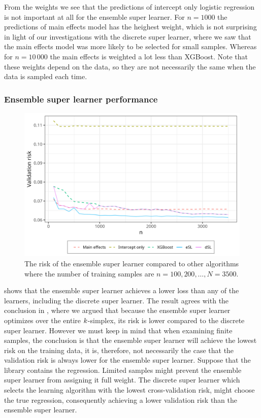 \documentclass[./main.tex]{subfiles}
\begin{document}
From the weights we see that the predictions of intercept only logistic regression is not important at all for the ensemble super learner. For $ n = 1000 $ the predictions of main effects model has the heighest weight, which is not surprising in light of our investigations with the discrete super learner, where we saw that the main effects model was more likely to be selected for small samples. Whereas for $ n = 10\,000 $ the main effects is weighted a lot less than XGBoost. Note that these weights depend on the data, so they are not necessarily the same when the data is sampled each time. 

\subsubsection{Ensemble super learner performance}
\begin{figure}[H]
    \centering
    \includegraphics[width=\textwidth]{figures/losses_esl_s23.png}
    \caption{The risk of the ensemble super learner compared to other algorithms where the number of training samples are $n = 100, 200, \dots , N = 3500 $.}
    \label{fig:losses_esl_s23}
\end{figure}
 shows that the ensemble super learner achieves a lower loss than any of the learners, including the discrete super learner. The result agrees with the conclusion in , where we argued that because the ensemble super learner optimizes over the entire $ k $-simplex, its risk is lower compared to the discrete super learner. However we must keep in mind that when examining finite samples, the conclusion is that the ensemble super learner will achieve the lowest risk on the training data, it is, therefore, not necessarily the case that the validation risk is always lower for the ensemble super learner. Suppose that the library contains the regression. Limited samples might prevent the ensemble super learner from assigning it full weight. The discrete super learner which selects the learning algorithm with the lowest cross-validation risk, might choose the true regression, consequently achieving a lower validation risk than the ensemble super learner.
\end{document}
